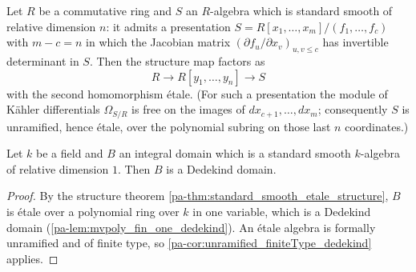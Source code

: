 \begin{theorem}
  \label{pa-thm:standard_smooth_etale_structure}
  \mathlibok

  Let \(R\) be a commutative ring and \(S\) an \(R\)-algebra which is standard smooth of
  relative dimension \(n\): it admits a presentation
  \(S = R[x_1,\dots,x_m]/(f_1,\dots,f_c)\) with \(m - c = n\) in which the Jacobian matrix
  \((\partial f_u/\partial x_v)_{u,v \le c}\) has invertible determinant in \(S\). Then the
  structure map factors as
  \[
    R \longrightarrow R[y_1, \dots, y_n] \longrightarrow S
  \]
  with the second homomorphism \'etale. (For such a presentation the module of K\"ahler
  differentials \(\Omega_{S/R}\) is free on the images of
  \(dx_{c+1}, \dots, dx_m\); consequently \(S\) is unramified, hence \'etale, over the
  polynomial subring on those last \(n\) coordinates.)
\end{theorem}

\begin{theorem}
  \label{pa-thm:standard_smooth_dim_one_dedekind}
  \leanok

  Let \(k\) be a field and \(B\) an integral domain which is a standard smooth
  \(k\)-algebra of relative dimension \(1\). Then \(B\) is a Dedekind domain.
\end{theorem}
\begin{proof}
  \leanok
  By the structure theorem \ref{pa-thm:standard_smooth_etale_structure}, \(B\) is \'etale over
  a polynomial ring over \(k\) in one variable, which is a Dedekind domain
  (\ref{pa-lem:mvpoly_fin_one_dedekind}). An \'etale algebra is formally unramified and of
  finite type, so \ref{pa-cor:unramified_finiteType_dedekind} applies.
\end{proof}

